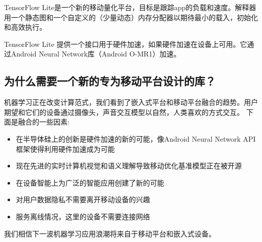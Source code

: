 TensorFlow Lite是一个新的移动量化平台，目标是跟踪app的负载和速度。解释器用一个静态图和一个自定义的（少量动态）内存分配器以期待最小的载入，初始化和高效执行。

TensorFlow Lite 提供一个接口用于硬件加速，如果硬件加速在设备上可用。它通过Android Neural Network库（Android O-MR1）加速。
\subsection{为什么需要一个新的专为移动平台设计的库？}
机器学习正在改变计算范式，我们看到了嵌入式平台和移动平台融合的趋势。用户期望和它们的设备通过摄像头，声音交互模型以自然，人类喜欢的方式交互。
下面是融合的一些因素:
\begin{itemize}
\item 在半导体硅上的创新是硬件加速的新的可能，像Android Neural Network API框架使得利用硬件加速成为可能
\item 现在先进的实时计算机视觉和语义理解导致移动优化基准模型正在被开源
\item 在设备智能上为广泛的智能应用创建了新的可能
\item 对用户数据隐私不需要离开移动设备的兴趣
\item 服务离线情况，这里的设备不需要连接网络
\end{itemize}
我们相信下一波机器学习应用浪潮将来自于移动平台和嵌入式设备。
